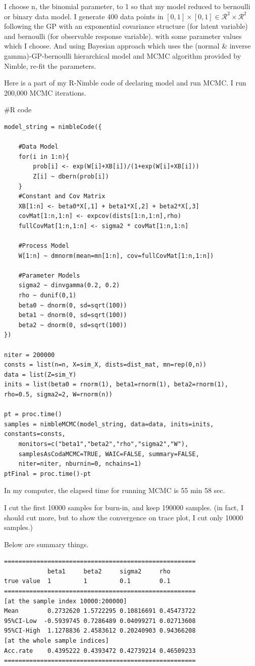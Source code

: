 \documentclass{article}
\newenvironment{Rcode}%
{%
    \begin{mdframed}
    \#R code
    \begin{small}
}
{%
    \end{small}
    \end{mdframed}
}
\begin{document}
I choose n, the binomial parameter, to 1 so that my model reduced to bernoulli or binary data model.
I generate 400 data points in $[0,1]\times[0,1] \in \mathcal{R}^2\times\mathcal{R}^2$
following the GP with an exponential covariance structure (for latent variable) and bernoulli (for observable response variable).
with some parameter values which I choose.
And using Bayesian approach which uses the (normal \& inverse gamma)-GP-bernoulli hierarchical model and
MCMC algorithm provided by Nimble, re-fit the parameters.

Here is a part of my R-Nimble code of declaring model and run MCMC.
I run 200,000 MCMC iterations.
\begin{Rcode}
    \begin{verbatim}
model_string = nimbleCode({

    #Data Model
    for(i in 1:n){
        prob[i] <- exp(W[i]+XB[i])/(1+exp(W[i]+XB[i]))
        Z[i] ~ dbern(prob[i])
    }
    #Constant and Cov Matrix
    XB[1:n] <- beta0*X[,1] + beta1*X[,2] + beta2*X[,3]
    covMat[1:n,1:n] <- expcov(dists[1:n,1:n],rho)
    fullCovMat[1:n,1:n] <- sigma2 * covMat[1:n,1:n]

    #Process Model
    W[1:n] ~ dmnorm(mean=mn[1:n], cov=fullCovMat[1:n,1:n])

    #Parameter Models
    sigma2 ~ dinvgamma(0.2, 0.2)
    rho ~ dunif(0,1)
    beta0 ~ dnorm(0, sd=sqrt(100))
    beta1 ~ dnorm(0, sd=sqrt(100))
    beta2 ~ dnorm(0, sd=sqrt(100))
})

niter = 200000
consts = list(n=n, X=sim_X, dists=dist_mat, mn=rep(0,n))
data = list(Z=sim_Y)
inits = list(beta0 = rnorm(1), beta1=rnorm(1), beta2=rnorm(1), rho=0.5, sigma2=2, W=rnorm(n))

pt = proc.time()
samples = nimbleMCMC(model_string, data=data, inits=inits, constants=consts,
    monitors=c("beta1","beta2","rho","sigma2","W"),
    samplesAsCodaMCMC=TRUE, WAIC=FALSE, summary=FALSE,
    niter=niter, nburnin=0, nchains=1)
ptFinal = proc.time()-pt
    \end{verbatim}
\end{Rcode}
In my computer, the elapsed time for running MCMC is 55 min 58 sec.

I cut the first 10000 samples for burn-in, and keep 190000 samples.
(in fact, I should cut more, but to show the convergence on trace plot, I cut only 10000 samples.)

Below are summary things.
\begin{verbatim}
=====================================================
            beta1     beta2     sigma2     rho
true value  1         1         0.1        0.1
=====================================================
[at the sample index 10000:200000]
Mean        0.2732620 1.5722295 0.10816691 0.45473722
95%CI-Low  -0.5939745 0.7286489 0.04099271 0.02713608
95%CI-High  1.1278836 2.4583612 0.20240903 0.94366208
[at the whole sample indices]
Acc.rate    0.4395222 0.4393472 0.42739214 0.46509233
=====================================================        
\end{verbatim}
\end{document}
